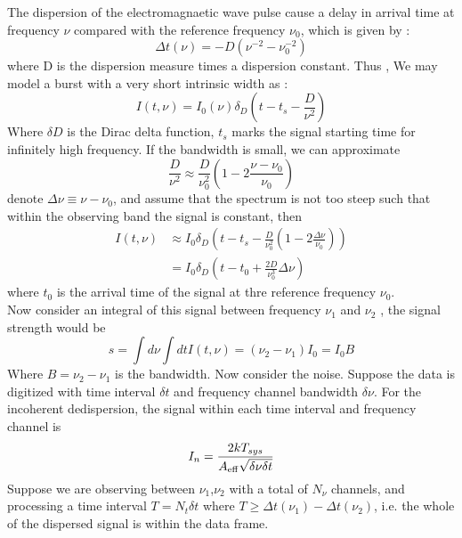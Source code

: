\documentclass[iop]{emulateapj}
\begin{document}
The dispersion of the electromagnaetic wave pulse cause a delay in arrival time at frequency $\nu$ compared with the reference frequency $\nu_0$, which is given by :
\begin{equation}
\Delta t (\nu) = -D(\nu^{-2} -\nu^{-2}_{0})\label{eq:Disperse relation}
\end{equation}
where D is the dispersion measure times a dispersion constant. Thus , We may model a burst with a very short intrinsic width as :
\begin{equation}
I(t,\nu)=I_0(\nu)\delta_D(t-t_s -\frac{D}{\nu^2})  
\end{equation}
Where $\delta D$ is the Dirac delta function, $t_s$ marks the signal starting time for infinitely high frequency. If the bandwidth is small, we can approximate
\begin{equation*}
\frac{D}{\nu^{2}}\approx\frac{D}{\nu_0^2}(1-2\frac{\nu-\nu_0}{\nu_0})
\end{equation*}
denote $\Delta　\nu \equiv \nu - \nu_0$, and assume that the spectrum is not too steep such that within the observing band the signal is constant, then
\begin{equation}
\begin{aligned}
I(t,\nu) & \approx I_0\delta_D(t-t_s-\frac{D}{\nu_0^2}(1-2\frac{\Delta\nu}{\nu_0}) ) \\
		 & = I_0\delta_D(t -t_0 +\frac{2D}{\nu_0^3}\Delta\nu)
\end{aligned} 
\end{equation} \label{eq:linear assumpution}
where $t_0$ is the arrival time of the signal at thre reference frequency $\nu_0$. \\
	Now consider an integral of this signal between frequency $\nu_1 $ and $\nu_2$ , the signal strength would be
\begin{equation}
s = \int d \nu \int dtI(t,\nu)=(\nu_2 -\nu_1)I_0 = I_0B
\end{equation}
Where $B =\nu_2 -\nu_1$ is the bandwidth. Now consider the noise. Suppose the data is digitized with time interval $\delta t$ and frequency channel bandwidth $\delta \nu$. For the incoherent dedispersion, the signal within each time interval and frequency channel is 
\begin{equation}
I_n = \frac{2k T_{sys}}{A_{\rm eff} \sqrt{\delta \nu \delta t}} 
\end{equation}
Suppose we are observing between $\nu_1$,$\nu_2$ with a total of $N_\nu$ channels, and processing a time interval $T = N_t \delta t$ where $T \geq \Delta t(\nu_1) -\Delta t(\nu_2)$, i.e. the whole of the dispersed signal is within the data frame. \\
\end{document}
